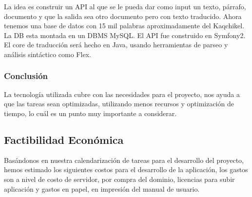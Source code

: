 \documentclass[a4paper,openright,11pt]{article}
\begin{document}
La idea es construir un API al que se le pueda dar como input un texto, p\'arrafo, documento y que la salida sea otro documento pero con texto traducido. Ahora tenemos una base de datos con 15 mil palabras aproximadamente del Kaqchikel. La DB esta montada en un DBMS MySQL. El API fue construido en Symfony2.\\

El core de traducci\'on ser\'a hecho en Java,  usando herramientas de parseo y an\'alisis sint\'actico como Flex.

\subsubsection{Conclusión}
La tecnología utilizada cubre con las necesidades para el proyecto, nos ayuda a que las tareas sean optimizadas, utilizando menos recursos y optimización de tiempo, lo cuál es un punto muy importante a considerar.

\subsection{Factibilidad Econ\'omica}
Bas\'andonos en nuestra calendarizaci\'on de tareas para el desarrollo del proyecto, hemos estimado los siguientes costos para el desarrollo de la aplicaci\'on, los gastos son a nivel de costo de servidor, por compra del dominio, licencias para subir aplicaci\'on y gastos en papel, en impresi\'on del manual de usuario.\\

\begin{table}[h]
\caption{Factibilidad Econ\'omica}
\end{table}
\end{document}

